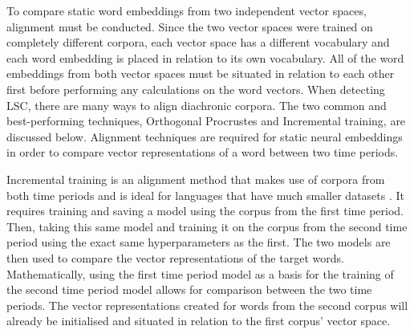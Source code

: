 To compare static word embeddings from two independent vector spaces, alignment must be conducted. Since the two vector spaces were trained on completely different corpora, each vector space has a different vocabulary and each word embedding is placed in relation to its own vocabulary. All of the word embeddings from both vector spaces must be situated in relation to each other first before performing any calculations on the word vectors. When detecting LSC, there are many ways to align diachronic corpora. The two common and best-performing techniques, Orthogonal Procrustes and Incremental training, are discussed below. Alignment techniques are required for static neural embeddings in order to compare vector representations of a word between two time periods. 

Incremental training is an alignment method that makes use of corpora from both time periods and is ideal for languages that have much smaller datasets \citep{kim-temporal2014}. It requires training and saving a model using the corpus from the first time period. Then, taking this same model and training it on the corpus from the second time period using the exact same hyperparameters as the first. The two models are then used to compare the vector representations of the target words. Mathematically, using the first time period model as a basis for the training of the second time period model allows for comparison between the two time periods. The vector representations created for words from the second corpus will already be initialised and situated in relation to the first corpus' vector space.

